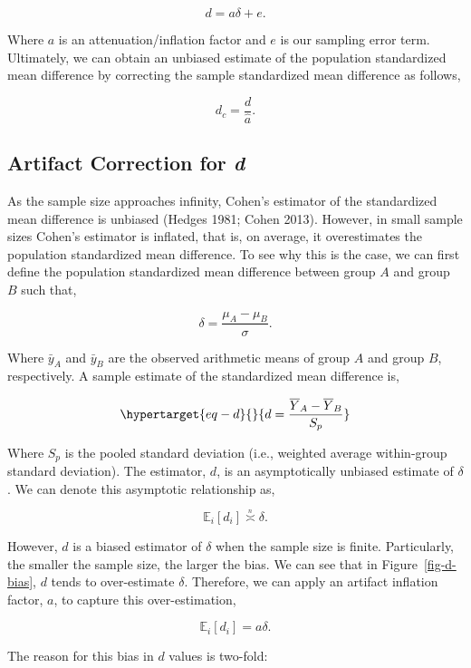 \documentclass[
  letterpaper,
  DIV=11,
  numbers=noendperiod]{scrreprt}
\begin{document}
\[
d = a\delta+e.
\]

Where \(a\) is an attenuation/inflation factor and \(e\) is our sampling
error term. Ultimately, we can obtain an unbiased estimate of the
population standardized mean difference by correcting the sample
standardized mean difference as follows,

\[
d_c = \frac{d}{\hat{a}}.
\]

\hypertarget{artifact-correction-for-d}{%
\subsection{\texorpdfstring{Artifact Correction for
\emph{d}}{Artifact Correction for d}}\label{artifact-correction-for-d}}

As the sample size approaches infinity, Cohen's estimator of the
standardized mean difference is unbiased (Hedges 1981; Cohen 2013).
However, in small sample sizes Cohen's estimator is inflated, that is,
on average, it overestimates the population standardized mean
difference. To see why this is the case, we can first define the
population standardized mean difference between group \(A\) and group
\(B\) such that,

\[
\delta = \frac{\mu_A-\mu_B}{\sigma}.
\]

Where \(\bar{y}_A\) and \(\bar{y}_B\) are the observed arithmetic means
of group \(A\) and group \(B\), respectively. A sample estimate of the
standardized mean difference is,

\begin{equation}\protect\hypertarget{eq-d}{}{
d = \frac{\overline{Y}_A-\overline{Y}_B}{S_p}
}\label{eq-d}\end{equation}

Where \(S_p\) is the pooled standard deviation (i.e., weighted average
within-group standard deviation). The estimator, \(d\), is an
asymptotically unbiased estimate of \(\delta\). We can denote this
asymptotic relationship as,

\[
\mathbb{E}_i[d_i] \overset{_n}{\asymp} \delta.
\]

However, \(d\) is a biased estimator of \(\delta\) when the sample size
is finite. Particularly, the smaller the sample size, the larger the
bias. We can see that in Figure~\ref{fig-d-bias}, \(d\) tends to
over-estimate \(\delta\). Therefore, we can apply an artifact inflation
factor, \(a\), to capture this over-estimation,

\[
\mathbb{E}_i[d_i] = a\delta.
\]

The reason for this bias in \(d\) values is two-fold:
\end{document}
